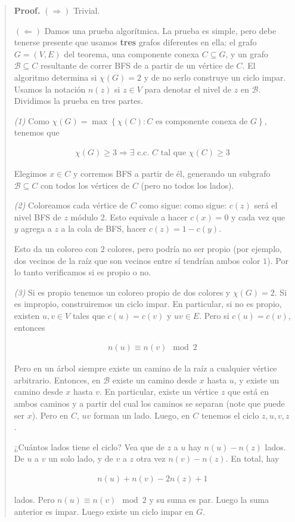 \documentclass[a4paper, 12pt]{article}
\begin{document}
\small
\begin{quote}

\textbf{Proof.} $(\Rightarrow)$ Trivial. 

$(\Leftarrow)$ Damos una prueba algorítmica. La prueba es simple, pero debe
tenerse presente que usamos \textbf{tres} grafos diferentes en ella: el grafo
$G = (V, E) $ del teorema, una componente conexa $C \subseteq G$, y un grafo
$\mathcal{B} \subseteq C$ resultante de correr BFS de a partir de un vértice de
$C$. El algoritmo determina si $\chi(G) = 2$ y de no serlo construye un ciclo
impar. Usamos la notación $n(z)$ si $z \in V$ para denotar el nivel de $z$ en
$\mathcal{B}$. Dividimos la prueba en tres partes.

\textit{(1)} Como $\chi(G) = \max \left\{ \chi(C) : C \text{ es componente
conexa de  } G \right\} $, tenemos que 

\begin{align*}
    \chi(G) \geq 3 \Rightarrow\exists \text{ c.c. $C$ tal que } \chi(C) \geq 3
\end{align*}

Elegimos $x \in C$ y corremos BFS a partir de él, generando un subgrafo
$\mathcal{B} \subseteq C$ con todos los vértices de $C$ (pero no todos los
lados).

\textit{(2)} Coloreamos cada vértice de $C$ como sigue: como sigue: $c(z)$ será el nivel
BFS de $z$ módulo 2. Esto equivale a hacer $c(x) = 0$ y cada vez que $y$ agrega
a $z$ a la cola de BFS, hacer $c(z) =  1 - c(y)$.

Esto da un coloreo con $2$ colores, pero podría no ser propio (por ejemplo, dos
vecinos de la raíz que son vecinos entre sí tendrían ambos color $1$). Por lo
tanto verificamos si es propio o no. 

\textit{(3)} Si es propio tenemos un coloreo propio de dos colores y $\chi(G) =
2$. Si es impropio, construiremos un ciclo impar. En particular, si no es
propio, existen $u, v \in V$ tales que $c(u) = c(v) $ y $uv \in E$. Pero si
$c(u) = c(v)$, entonces

\begin{align*}
    n(u) \equiv n(v) \mod 2
\end{align*}

Pero en un árbol siempre existe un camino
de la raíz a cualquier vértice arbitrario. Entonces, en $\mathcal{B}$ existe un
camino desde $x$ hasta $u$, y existe un camino desde $x$ hasta $v$. En
particular, existe un vértice $z$ que está en ambos caminos y a partir del cual
los caminos se separan (note que puede ser $x$). Pero en $C$, $uv$ forman un
lado. Luego, en $C$ tenemos el ciclo $z, u, v, z$. 

¿Cuántos lados tiene el ciclo? Vea que de $z$ a $u$ hay $n(u) - n(z)$
lados. De $u$ a $v$ un solo lado, y de $v$ a $z$ otra vez $n(v) - n(z)$.
En total, hay 

\begin{align*}
     n(u) + n(v) - 2 n(z) + 1
\end{align*}

lados. Pero $n(u) \equiv n(v) \mod 2$ y su suma
es par. Luego la suma anterior es impar. Luego existe un ciclo impar en $G$.

\end{quote}
\normalsize
\end{document}
